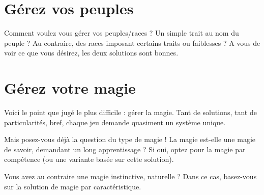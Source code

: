 \documentclass{conf/FusinaClass}
\begin{document}
\chapter{Gérez vos peuples}
Comment voulez vous gérer vos peuples/races ? Un simple trait au nom du peuple ? Au contraire, des races imposant certains traits ou faiblesses ? A vous de voir ce que vous désirez, les deux solutions sont bonnes.

\chapter{Gérez votre magie}
Voici le point que jugé le plus difficile : gérer la magie. Tant de solutions, tant de particularités, bref, chaque jeu demande quasiment un système unique. 

Mais posez-vous déjà la question du type de magie ! La magie est-elle une magie de savoir, demandant un long apprentissage ? Si oui, optez pour la magie par compétence (ou une variante basée sur cette solution).

Vous avez au contraire une magie instinctive, naturelle ? Dans ce cas, basez-vous sur la solution de magie par caractéristique.


\end{document}
